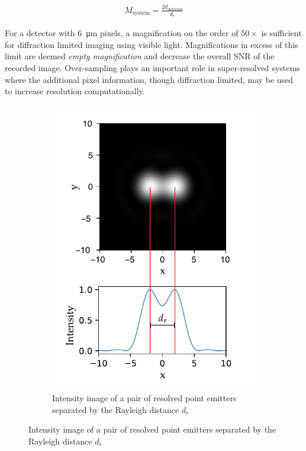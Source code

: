 \begin{align}
    M_\text{system} = \frac{2d_\text{detector}}{d_r}
\end{align}


For a detector with \SI{6}{\micro\meter} pixels, a magnification on the order of $50\times$ is sufficient for diffraction limited imaging using visible light.
Magnifications in excess of this limit are deemed \emph{empty magnification} and decrease the overall \gls{SNR} of the recorded image.
Over-sampling plays an important role in super-resolved systems where the additional pixel information, though diffraction limited, may be used to increase resolution computationally.

\begin{figure}
    \centering
    \begin{subfigure}[b]{\textwidth}
        \centering
        \includegraphics{./sampling/sample_master}
        \caption{Intensity image of a pair of resolved point emitters separated by the Rayleigh distance $d_{r}$}
        \label{fig:sample_master}
    \end{subfigure}
\end{figure}~
